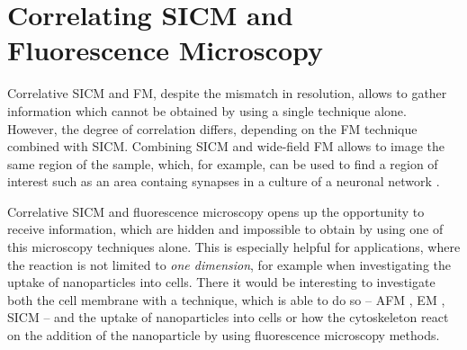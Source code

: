 \section{Correlating SICM and Fluorescence Microscopy}
\label{sec:correlating-sicm-and-fm}

Correlative SICM and FM, despite the mismatch in resolution, allows to gather
information which cannot be obtained by using a single technique
alone. However, the degree of correlation differs, depending on the FM
technique combined with SICM. Combining SICM and wide-field FM allows to image
the same region of the sample, which, for example, can be used to find a
region of interest such as an area containg synapses in a culture of a
neuronal network \cite{Novak2013,Scheenen2015}. 




Correlative SICM and fluorescence microscopy opens up the opportunity to receive information, 
which are hidden and impossible to obtain by using one of this microscopy techniques alone. 
This is especially helpful for applications, where the reaction is not limited to \emph{one 
dimension}, for example when investigating the uptake of nanoparticles into cells. There it would 
be interesting to investigate both the cell membrane with a technique, which is able to do so -- 
AFM \cite{Binnig1986}, EM \cite{}, SICM \cite{Hansma1989} -- and the uptake of nanoparticles into 
cells or how the cytoskeleton react on the addition of the nanoparticle by using fluorescence 
microscopy methods.

